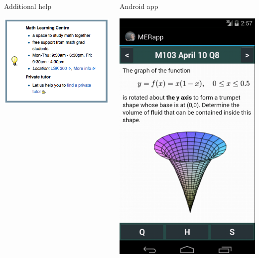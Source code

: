 \documentclass[final]{beamer}
\newlength{\onecolwid}
\begin{document}
\begin{frame}[t]
\begin{columns}[t]
\begin{column}{\onecolwid}
\begin{center}
\begin{columns}[t]
\begin{column}{.45\textwidth}
\begin{block}{Additional help}
\bigskip

\begin{center}
\includegraphics[width=.6\textwidth]{additional_help.png}
\end{center}
\end{block}
\end{column} \hfill
\begin{column}{.45\textwidth}
\begin{block}{Android app}
\begin{center}
\includegraphics[width=.5\textwidth]{app_screen.png}
\end{center}
\end{block}
\end{column}
\hfill \mbox{}
\end{columns}
\end{center}



\end{column}
\end{columns}
\end{frame}
\end{document}
